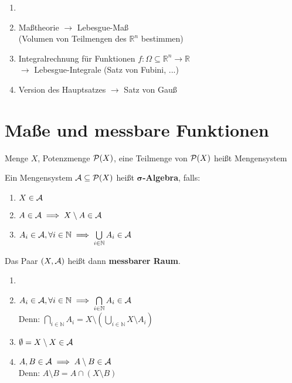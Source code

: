 \documentclass[11pt,a4paper,fleqn,openany]{report}
\begin{document}
  \begin{goals}
    \begin{enumerate}
      \item[]
      \item Maßtheorie $\to$ Lebesgue-Maß\\(Volumen von Teilmengen des $\mathbb{R}^n$ bestimmen)
      \item Integralrechnung für Funktionen $f:\Omega \subseteq \mathbb{R}^n \to \mathbb{R}$\\$\to$ Lebesgue-Integrale (Satz von Fubini, ...)
      \item Version des Hauptsatzes $\to$ Satz von Gauß 
    \end{enumerate}
  \end{goals}

  \chapter{Maße und messbare Funktionen}

    \begin{notation}
      Menge $X$, Potenzmenge $\mathcal{P}(X)$, eine Teilmenge von $\mathcal{P}(X)$ heißt Mengensystem
    \end{notation}

    \begin{definition}
      Ein Mengensystem $\mathcal{A} \subseteq \mathcal{P}(X)$ heißt \textbf{$\bm{\sigma}$-Algebra}, falls:
      \begin{enumerate}[label=(\roman*)]
        \item $X \in \mathcal{A}$
        \item $A \in \mathcal{A} \implies X \setminus A \in \mathcal{A}$
        \item $A_i \in \mathcal{A}, \forall i \in \mathbb{N} \implies \bigcup\limits_{i \in \mathbb{N}} A_i \in \mathcal{A}$
      \end{enumerate}
      Das Paar $(X, \mathcal{A})$ heißt dann \textbf{messbarer Raum}.
    \end{definition}

    \begin{remark}
      \begin{enumerate}
        \item[]
        \item $A_i \in \mathcal{A}, \forall i \in \mathbb{N} \implies \bigcap\limits_{i \in \mathbb{N}} A_i \in \mathcal{A}$\\
              Denn: $\bigcap\limits_{i \in \mathbb{N}} A_i = X \setminus (\bigcup\limits_{i \in \mathbb{N}} X \setminus A_i)$
        \item $\emptyset = X \setminus X \in \mathcal{A}$
        \item $A,B \in \mathcal{A} \implies A \setminus B \in \mathcal{A}$\\
              Denn: $A \setminus B = A \cap (X \setminus B)$
      \end{enumerate}
    \end{remark}
\end{document}
